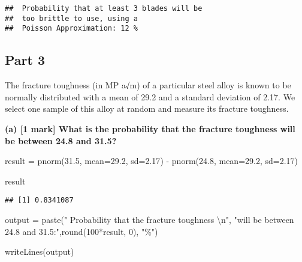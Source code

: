\documentclass[
]{article}
\newenvironment{Shaded}{\begin{snugshade}}{\end{snugshade}}
\newcommand{\AttributeTok}[1]{\textcolor[rgb]{0.77,0.63,0.00}{#1}}
\newcommand{\DecValTok}[1]{\textcolor[rgb]{0.00,0.00,0.81}{#1}}
\newcommand{\FloatTok}[1]{\textcolor[rgb]{0.00,0.00,0.81}{#1}}
\newcommand{\FunctionTok}[1]{\textcolor[rgb]{0.00,0.00,0.00}{#1}}
\newcommand{\NormalTok}[1]{#1}
\newcommand{\OtherTok}[1]{\textcolor[rgb]{0.56,0.35,0.01}{#1}}
\newcommand{\SpecialCharTok}[1]{\textcolor[rgb]{0.00,0.00,0.00}{#1}}
\newcommand{\StringTok}[1]{\textcolor[rgb]{0.31,0.60,0.02}{#1}}
\begin{document}
\begin{verbatim}
##  Probability that at least 3 blades will be
##  too brittle to use, using a 
##  Poisson Approximation: 12 %
\end{verbatim}

\newpage

\hypertarget{part-3}{%
\subsection{Part 3}\label{part-3}}

The fracture toughness (in MP a√m) of a particular steel alloy is known
to be normally distributed with a mean of 29.2 and a standard deviation
of 2.17. We select one sample of this alloy at random and measure its
fracture toughness.

\newline
\newline

\textbf{(a) {[}1 mark{]} What is the probability that the fracture
toughness will be between 24.8 and 31.5?}

\begin{Shaded}
\begin{Highlighting}[]
\NormalTok{result }\OtherTok{=} \FunctionTok{pnorm}\NormalTok{(}\FloatTok{31.5}\NormalTok{, }\AttributeTok{mean=}\FloatTok{29.2}\NormalTok{, }\AttributeTok{sd=}\FloatTok{2.17}\NormalTok{) }\SpecialCharTok{{-}} \FunctionTok{pnorm}\NormalTok{(}\FloatTok{24.8}\NormalTok{, }\AttributeTok{mean=}\FloatTok{29.2}\NormalTok{, }\AttributeTok{sd=}\FloatTok{2.17}\NormalTok{)}

\NormalTok{result}
\end{Highlighting}
\end{Shaded}

\begin{verbatim}
## [1] 0.8341087
\end{verbatim}

\begin{Shaded}
\begin{Highlighting}[]
\NormalTok{output }\OtherTok{=} \FunctionTok{paste}\NormalTok{(}\StringTok{" Probability that the fracture toughness }\SpecialCharTok{\textbackslash{}n}\StringTok{"}\NormalTok{, }
               \StringTok{"will be between 24.8 and 31.5:"}\NormalTok{,}\FunctionTok{round}\NormalTok{(}\DecValTok{100}\SpecialCharTok{*}\NormalTok{result, }\DecValTok{0}\NormalTok{), }\StringTok{"\%"}\NormalTok{)}

\FunctionTok{writeLines}\NormalTok{(output)}
\end{Highlighting}
\end{Shaded}
\end{document}
